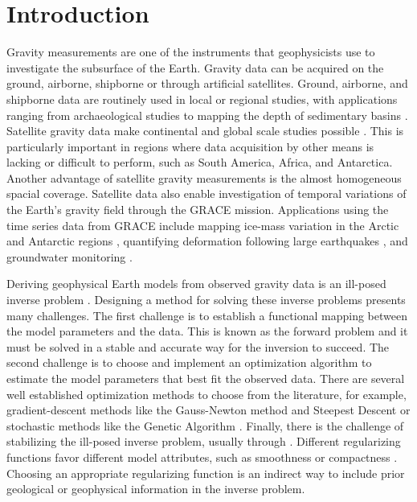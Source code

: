 \chapter{Introduction}


Gravity measurements are one of the instruments that geophysicists use to
investigate the subsurface of the Earth.
Gravity data can be acquired on the ground, airborne, shipborne or through
artificial satellites.
Ground, airborne, and shipborne data are routinely used in local or regional
studies, with applications ranging from archaeological studies
\citep[e.g., ][]{panisova2013} to mapping the depth of
sedimentary basins \citep[e.g., ][]{gordon2013}.
Satellite gravity data make continental and global scale studies possible
\citep[e.g., ][]{vandermeijde2013, vandermeijde2015, bouman2013,
braitenberg2015, reguzzoni2013}.
This is particularly important in regions where data acquisition by other means
is lacking or difficult to perform, such as South America, Africa, and
Antarctica.
Another advantage of satellite gravity measurements is the almost homogeneous
spacial coverage.
Satellite data also enable investigation of temporal variations of the Earth's
gravity field through the GRACE mission.
Applications using the time series data from GRACE include mapping ice-mass
variation in the Arctic \citep{chen2011} and Antarctic regions
\citep{ramillien2006}, quantifying deformation following large earthquakes
\citep{mikhailov2014}, and groundwater monitoring \citep{humphrey2016}.

Deriving geophysical Earth models from observed gravity data is an ill-posed
inverse problem \DIFaddbegin {}\DIFaddend .
Designing a method for solving these inverse problems presents many challenges.
The first challenge is to establish a functional mapping between the model
parameters and the data.
This is known as the forward problem and it must be solved in a stable and
accurate way for the inversion to succeed.
The second challenge is to choose and implement an optimization algorithm to
estimate the model parameters that best fit the observed data.
There are several well established optimization methods to choose from the
literature, for example, gradient-descent methods like the Gauss-Newton method
and Steepest Descent or stochastic  methods like the Genetic Algorithm
\DIFaddbegin {}\DIFaddend .
Finally, there is the challenge of stabilizing the ill-posed inverse problem,
usually through \DIFdelbegin {}\DIFdelend \DIFaddbegin {}\DIFaddend .
Different regularizing functions favor different model attributes, such as
smoothness or compactness \DIFaddbegin {}\DIFaddend .
Choosing an appropriate regularizing function is an indirect way to include
prior geological or geophysical information in the inverse problem.

